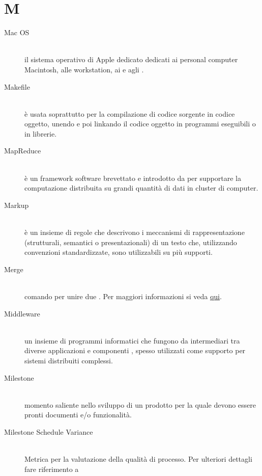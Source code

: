 \documentclass[12pt,a4paper]{article}
\begin{document}
\newpage

\section{M}

\begin{description}
\item[Mac OS] 
\hfill\\ il sistema operativo di Apple dedicato dedicati ai personal computer Macintosh, alle workstation, ai  e agli .

\item[Makefile] 
\hfill\\ è usata soprattutto per la compilazione di codice sorgente in codice oggetto, unendo e poi linkando il codice oggetto in programmi eseguibili o in librerie.

\item[MapReduce] 
\hfill\\ è un framework software brevettato e introdotto da  per supportare la computazione distribuita su grandi quantità di dati in cluster di computer.

\item[Markup] 
\hfill\\ è un insieme di regole che descrivono i meccanismi di rappresentazione (strutturali, semantici o presentazionali) di un testo che, utilizzando convenzioni standardizzate, sono utilizzabili su più supporti.

\item[Merge] 
\hfill\\ comando  per unire due . Per maggiori informazioni si veda \href{https://git-scm.com/docs/}{qui}.

\item[Middleware] 
\hfill\\ un insieme di programmi informatici che fungono da intermediari tra diverse applicazioni e componenti ,  spesso utilizzati come supporto per sistemi distribuiti complessi.


\item[Milestone] 
\hfill\\ momento saliente nello sviluppo di un prodotto  per la quale devono essere pronti documenti e/o funzionalità.

\item[Milestone Schedule Variance]
\hfill\\ Metrica per la valutazione della qualità di processo. Per ulteriori dettagli fare riferimento a \PdQ{}


\end{description}
\end{document}
